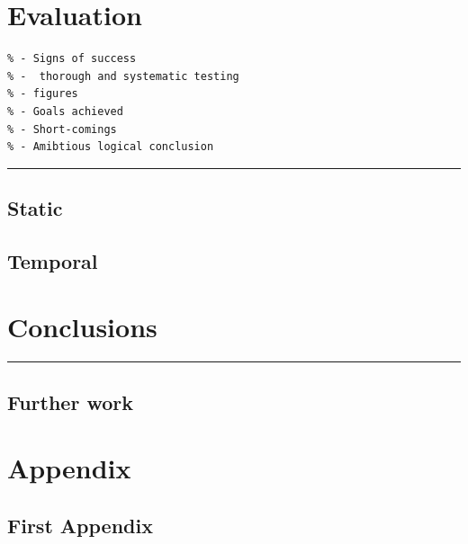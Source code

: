 \documentclass[a4paper,12pt,twoside,notitlepage]{report}
\newcommand{\rulewidth}{300pt}
\newcommand{\halfrule}{
  \begin{center}
    {\rule{\rulewidth}{0.5pt}}
  \end{center}}
\begin{document}
\chapter{Evaluation}

\begin{verbatim}
% - Signs of success
% -  thorough and systematic testing
% - figures
% - Goals achieved
% - Short-comings
% - Amibtious logical conclusion 
\end{verbatim}

\halfrule

\section{Static}

\section{Temporal}

\chapter{Conclusions}

\halfrule

\section{Further work}


\begin{thebibliography}{}
\end{thebibliography}


\appendix
\chapter*{Appendix}

\section{First Appendix}
\end{document}
